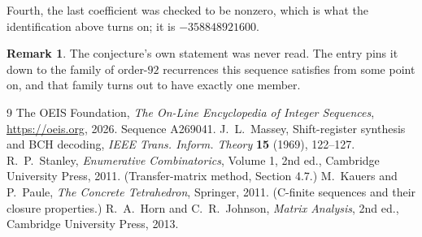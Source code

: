 \documentclass[11pt,a4paper]{article}
\theoremstyle{plain}
\theoremstyle{definition}
\newtheorem{remark}[theorem]{Remark}
\begin{document}
Fourth, the last coefficient was checked to be nonzero, which is what the identification above
turns on; it is $-358848921600$.

\begin{remark}
The conjecture's own statement was never read. The entry pins it down to the family of
order-$92$ recurrences this sequence satisfies from some point on, and that family turns
out to have exactly one member.
\end{remark}

\begin{thebibliography}{9}
 The OEIS Foundation, \emph{The On-Line Encyclopedia of Integer
Sequences}, \url{https://oeis.org}, 2026. Sequence A269041.
 J.~L.~Massey, Shift-register synthesis and BCH decoding, \emph{IEEE
Trans. Inform. Theory} \textbf{15} (1969), 122--127.
 R.~P.~Stanley, \emph{Enumerative Combinatorics}, Volume 1, 2nd ed.,
Cambridge University Press, 2011. (Transfer-matrix method, Section 4.7.)
 M.~Kauers and P.~Paule, \emph{The Concrete Tetrahedron}, Springer, 2011.
(C-finite sequences and their closure properties.)
 R.~A.~Horn and C.~R.~Johnson, \emph{Matrix Analysis}, 2nd ed., Cambridge
University Press, 2013.
\end{thebibliography}
\end{document}
